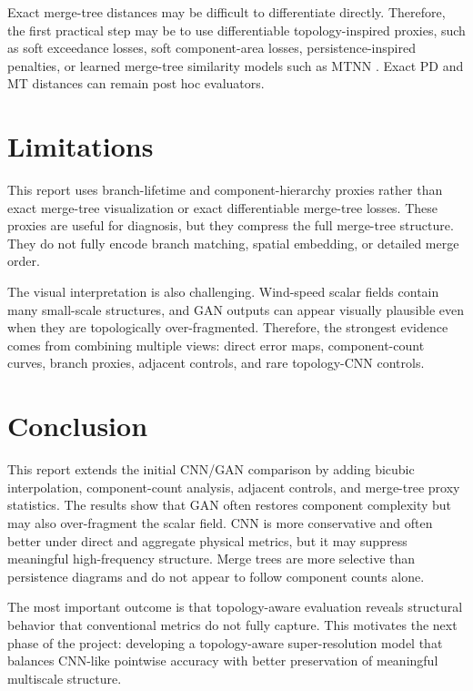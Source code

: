 \documentclass[10pt,conference]{IEEEtran}
\begin{document}
Exact merge-tree distances may be difficult to differentiate directly. Therefore,
the first practical step may be to use differentiable topology-inspired proxies, such
as soft exceedance losses, soft component-area losses, persistence-inspired penalties,
or learned merge-tree similarity models such as MTNN \cite{qin2024mtnn}. Exact PD
and MT distances can remain post hoc evaluators.


\section{Limitations}

This report uses branch-lifetime and component-hierarchy proxies rather than exact
merge-tree visualization or exact differentiable merge-tree losses. These proxies
are useful for diagnosis, but they compress the full merge-tree structure. They do
not fully encode branch matching, spatial embedding, or detailed merge order.

The visual interpretation is also challenging. Wind-speed scalar fields contain many
small-scale structures, and GAN outputs can appear visually plausible even when they
are topologically over-fragmented. Therefore, the strongest evidence comes from
combining multiple views: direct error maps, component-count curves, branch proxies,
adjacent controls, and rare topology-CNN controls.


\section{Conclusion}

This report extends the initial CNN/GAN comparison by adding bicubic interpolation,
component-count analysis, adjacent controls, and merge-tree proxy statistics. The
results show that GAN often restores component complexity but may also over-fragment
the scalar field. CNN is more conservative and often better under direct and aggregate
physical metrics, but it may suppress meaningful high-frequency structure. Merge trees
are more selective than persistence diagrams and do not appear to follow component
counts alone.

The most important outcome is that topology-aware evaluation reveals structural
behavior that conventional metrics do not fully capture. This motivates the next phase
of the project: developing a topology-aware super-resolution model that balances
CNN-like pointwise accuracy with better preservation of meaningful multiscale structure.



\end{document}
